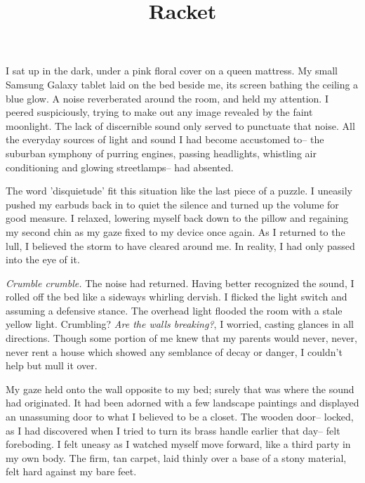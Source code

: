 \documentclass[12pt]{article}
\title{Racket}
\begin{document}
\makeheader
\hspace{0.5in}
I sat up in the dark, under a pink floral cover on a queen mattress.  My small Samsung Galaxy tablet laid on the bed beside me, its screen bathing the ceiling a blue glow.  A noise reverberated around the room, and held my attention.  I peered suspiciously, trying to make out any image revealed by the faint moonlight.  The lack of discernible sound only served to punctuate that noise.  All the everyday sources of light and sound I had become accustomed to-- the suburban symphony of purring engines, passing headlights, whistling air conditioning and glowing streetlamps-- had absented.

The word 'disquietude' fit this situation like the last piece of a puzzle.  I uneasily pushed my earbuds back in to quiet the silence and turned up the volume for good measure.  I relaxed, lowering myself back down to the pillow and regaining my second chin as my gaze fixed to my device once again.  As I returned to the lull, I believed the storm to have cleared around me.  In reality, I had only passed into the eye of it.

\textit{Crumble crumble.}  The noise had returned.  Having better recognized the sound, I rolled off the bed like a sideways whirling dervish.  I flicked the light switch and assuming a defensive stance.  The overhead light flooded the room with a stale yellow light.  Crumbling?  \textit{Are the walls breaking?}, I worried, casting glances in all directions.  Though some portion of me knew that my parents would never, never, never rent a house which showed any semblance of decay or danger, I couldn't help but mull it over.

My gaze held onto the wall opposite to my bed; surely that was where the sound had originated.  It had been adorned with a few landscape paintings and displayed an unassuming door to what I believed to be a closet.  The wooden door-- locked, as I had discovered when I tried to turn its brass handle earlier that day-- felt foreboding.  I felt uneasy as I watched myself move forward, like a third party in my own body.  The firm, tan carpet, laid thinly over a base of a stony material, felt hard against my bare feet.
\end{document}
